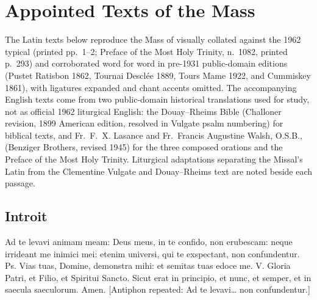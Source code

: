 \section{Appointed Texts of the Mass}

The Latin texts below reproduce the Mass of  visually collated against the 1962 typical  (printed pp.~1--2; Preface of the Most Holy Trinity, n.~1082, printed p.~293) and corroborated word for word in pre-1931 public-domain editions (Pustet Ratisbon 1862, Tournai Descl\'ee 1889, Tours Mame 1922, and Cummiskey 1861), with ligatures expanded and chant accents omitted. The accompanying English texts come from two public-domain historical translations used for study, not as official 1962 liturgical English: the Douay--Rheims Bible (Challoner revision, 1899 American edition, resolved in Vulgate psalm numbering) for biblical texts, and Fr.~F.~X. Lasance and Fr.~Francis Augustine Walsh, O.S.B.,  (Benziger Brothers, revised 1945) for the three composed orations and the Preface of the Most Holy Trinity. Liturgical adaptations separating the Missal's Latin from the Clementine Vulgate and Douay--Rheims text are noted beside each passage.

\subsection{Introit}\label{proper-introit}

\begin{latinproper}
Ad te levavi animam meam: Deus meus, in te confido, non erubescam: neque irrideant me inimici mei: etenim universi, qui te exspectant, non confundentur. \textnormal{Ps.} Vias tuas, Domine, demonstra mihi: et semitas tuas edoce me. \textnormal{V.} Gloria Patri, et Filio, et Spiritui Sancto. Sicut erat in principio, et nunc, et semper, et in saecula saeculorum. Amen. \textnormal{[Antiphon repeated: Ad te levavi\dots{} non confundentur.]}
\end{latinproper}

